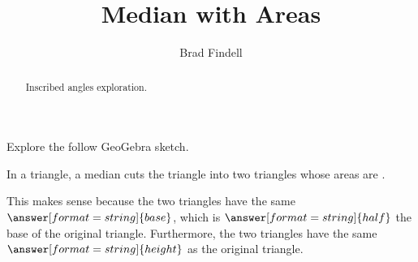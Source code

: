 \documentclass[handout,nooutcomes]{ximera}
\title{Median with Areas}
\author{Brad Findell}
\begin{document}
\begin{abstract}
Inscribed angles exploration. 
\end{abstract}
\maketitle




\begin{problem}
Explore the follow GeoGebra sketch.  
\begin{center}  
\end{center}
In a triangle, a median cuts the triangle into two triangles whose areas are .  

This makes sense because the two triangles have the same $\answer[format=string]{base}$, which is 
$\answer[format=string]{half}$ the base of the original triangle.  Furthermore, the two triangles have the same $\answer[format=string]{height}$ as the original triangle.  

\end{problem}
\end{document}
